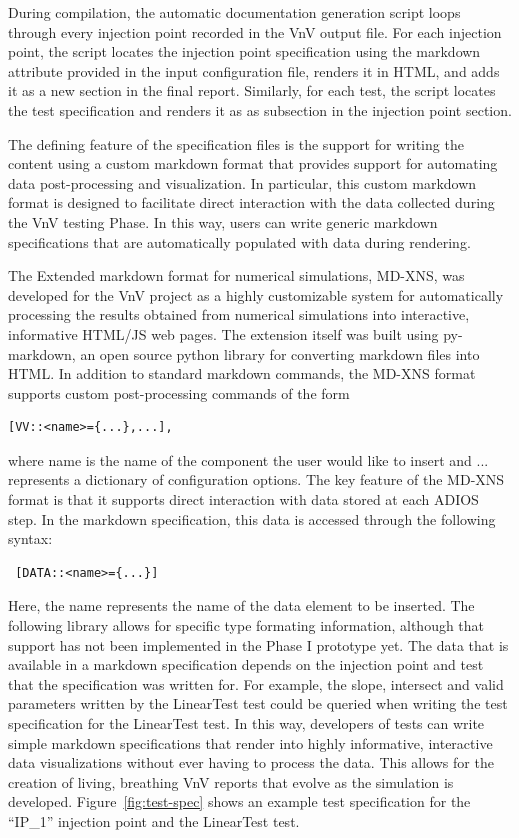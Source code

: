 During compilation, the automatic documentation generation script loops through every injection point recorded in the VnV output file. For each injection point, the script locates the injection point specification using the markdown attribute provided in the input configuration file, renders it in HTML, and adds it as a new section in the final report. Similarly, for each test, the script locates the test specification and renders it as as subsection in the injection point section. 

The defining feature of the specification files is the support for writing the content using a custom markdown format that provides support for automating data post-processing and visualization. In particular, this custom markdown format is designed to facilitate direct interaction with the data collected during the VnV testing Phase. In this way, users can write generic markdown specifications that are automatically populated with data during rendering.   

The Extended markdown format for numerical simulations, MD-XNS,  was developed for the VnV project as a highly customizable system for automatically processing the results obtained from numerical simulations into interactive, informative HTML/JS web pages. The extension itself was built using py-markdown, an open source python library for converting markdown files into HTML. In addition to standard markdown commands, the MD-XNS format supports custom post-processing commands of the form 

\begin{verbatim}
[VV::<name>={...},...], 
\end{verbatim}
where name is the name of the component the user would like to insert and {...} represents a dictionary of configuration options. The key feature of the MD-XNS format is that it supports direct interaction with data stored at each ADIOS step. In the markdown specification, this data is accessed through the following syntax: 
\begin{verbatim}
 [DATA::<name>={...}] 
\end{verbatim}
Here, the name represents the name of the data element to be inserted. The following library allows for specific type formating information, although that support has not been implemented in the Phase I prototype yet. The data that is available in a markdown specification depends on the injection point and test that the specification was written for. For example, the slope, intersect and valid parameters written by the LinearTest test could be queried when writing the test specification for the LinearTest test. In this way, developers of tests can write simple markdown specifications that render into highly informative, interactive data visualizations without ever having to process the data. This allows for the creation of living, breathing VnV reports that evolve as the simulation is developed. Figure~\ref{fig:test-spec} shows an example test specification for the ``IP\_1'' injection point and the LinearTest test. 

